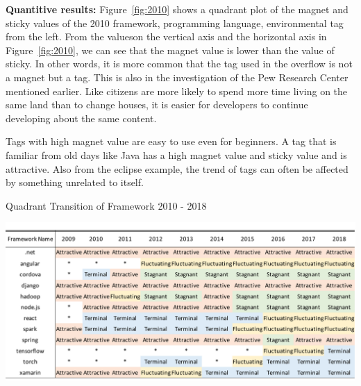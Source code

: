 \documentclass[conference]{IEEEtran}
\begin{document}
\textbf{Quantitive results:}
Figure~\ref{fig:2010} shows a quadrant plot of the magnet and sticky values ​​of the 2010 framework, programming language, environmental tag from the left. From the values ​​on the vertical axis and the horizontal axis in Figure~\ref{fig:2010}, we can see that the magnet value is lower than the value of sticky. In other words, it is more common that the tag used in the overflow is not a magnet but a tag. This is also in the investigation of the Pew Research Center mentioned earlier. Like citizens are more likely to spend more time living on the same land than to change houses,  it is easier for developers to continue developing about the same content.
\smallskip
%   

\begin{oframed}

 Tags with high magnet value are easy to use even for beginners. A tag that is familiar from old days like Java has a high magnet value and sticky value and is attractive. Also from the eclipse example, the trend of tags can often be affected by something unrelated to itself.
 \smallskip\smallskip
\end{oframed}
\medskip


\begin{table}[t]
 \centering
 \caption{Quadrant Transition of Framework 2010 - 2018} 
 \includegraphics[width=1.0\hsize]{img/frame2010-2018.pdf} 
 \label{table1} 
\end{table}
\end{document}
